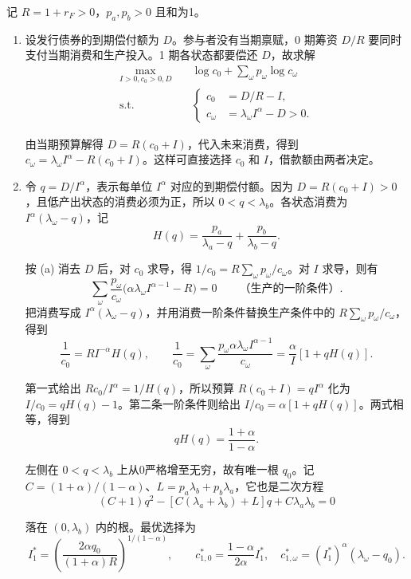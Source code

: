 \begin{solution}[blank-type=manual,blank-vsep=9\baselineskip]

记 $R=1+r_F>0$，$p_a,p_b>0$ 且和为1。
\begin{enumerate}[label=(\alph*)]
\item 设发行债券的到期偿付额为 $D$。参与者没有当期禀赋，0 期筹资 $D/R$ 要同时支付当期消费和生产投入。1 期各状态都要偿还 $D$，故求解
\[
 \begin{aligned}
 \max_{I>0,c_0>0,D}\quad &\log c_0+\sum_\omega p_\omega\log c_\omega\\
 \text{s.t.}\quad &
 \left\{\begin{aligned}
 c_0&=D/R-I,\\
 c_\omega&=\lambda_\omega I^\alpha-D>0.
 \end{aligned}\right.
 \end{aligned}
\]

由当期预算解得 $D=R(c_0+I)$，代入未来消费，得到 $c_\omega=\lambda_\omega I^\alpha-R(c_0+I)$。这样可直接选择 $c_0$ 和 $I$，借款额由两者决定。
\item 令 $q=D/I^\alpha$，表示每单位 $I^\alpha$ 对应的到期偿付额。因为 $D=R(c_0+I)>0$，且低产出状态的消费必须为正，所以 $0<q<\lambda_b$。各状态消费为 $I^\alpha(\lambda_\omega-q)$，记
\[
 H(q)=\frac{p_a}{\lambda_a-q}+\frac{p_b}{\lambda_b-q}.
\]

按 (a) 消去 $D$ 后，对 $c_0$ 求导，得 $1/c_0=R\sum_\omega p_\omega/c_\omega$。对 $I$ 求导，则有
\[
 \sum_\omega\frac{p_\omega}{c_\omega}
       \bigl(\alpha\lambda_\omega I^{\alpha-1}-R\bigr)=0
 \qquad\text{（生产的一阶条件）}.
\]
把消费写成 $I^\alpha(\lambda_\omega-q)$，并用消费一阶条件替换生产条件中的 $R\sum_\omega p_\omega/c_\omega$，得到
\[
 \frac1{c_0}=R I^{-\alpha}H(q),\qquad
 \frac1{c_0}=\sum_\omega\frac{p_\omega\alpha\lambda_\omega I^{\alpha-1}}{c_\omega}
 =\frac\alpha I[1+qH(q)].
\]

第一式给出 $Rc_0/I^\alpha=1/H(q)$，所以预算 $R(c_0+I)=qI^\alpha$ 化为 $I/c_0=qH(q)-1$。第二条一阶条件则给出 $I/c_0=\alpha[1+qH(q)]$。两式相等，得到
\[
 qH(q)=\frac{1+\alpha}{1-\alpha}.
\]

左侧在 $0<q<\lambda_b$ 上从0严格增至无穷，故有唯一根 $q_0$。记 $C=(1+\alpha)/(1-\alpha)$、$L=p_a\lambda_b+p_b\lambda_a$，它也是二次方程
\[
 (C+1)q^2-[C(\lambda_a+\lambda_b)+L]q+C\lambda_a\lambda_b=0
\]

落在 $(0,\lambda_b)$ 内的根。最优选择为
\[
 \boxed{I_1^*=\left(\frac{2\alpha q_0}{(1+\alpha)R}\right)^{1/(1-\alpha)}},\qquad
 c_{1,0}^*=\frac{1-\alpha}{2\alpha}I_1^*,\quad
 c_{1,\omega}^*=(I_1^*)^\alpha(\lambda_\omega-q_0).
\]


\end{enumerate}
\end{solution}

